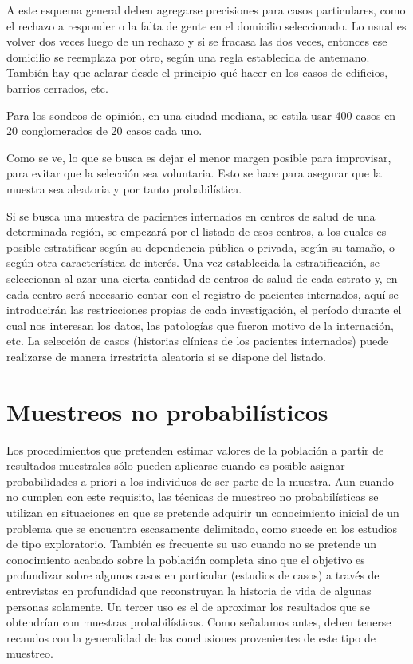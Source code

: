 \documentclass[]{book}
\begin{document}
A este esquema general deben agregarse precisiones para casos
particulares, como el rechazo a responder o la falta de gente en el
domicilio seleccionado. Lo usual es volver dos veces luego de un rechazo y si se fracasa las dos veces, entonces ese domicilio se reemplaza por otro, según una regla establecida de antemano. También hay que aclarar desde el principio qué hacer en los casos de edificios, barrios cerrados, etc.

Para los sondeos de opinión, en una ciudad mediana, se estila usar 400
casos en 20 conglomerados de 20 casos cada uno.

Como se ve, lo que se busca es dejar el menor margen posible para
improvisar, para evitar que la selección sea voluntaria. Esto se hace
para asegurar que la muestra sea aleatoria y por tanto probabilística.

Si se busca una muestra de pacientes internados en centros de salud de
una determinada región, se empezará por el listado de esos centros, a
los cuales es posible estratificar según su dependencia pública o
privada, según su tamaño, o según otra característica de interés. Una
vez establecida la estratificación, se seleccionan al azar una cierta
cantidad de centros de salud de cada estrato y, en cada centro será
necesario contar con el registro de pacientes internados, aquí se
introducirán las restricciones propias de cada investigación, el período
durante el cual nos interesan los datos, las patologías que fueron
motivo de la internación, etc. La selección de casos (historias clínicas
de los pacientes internados) puede realizarse de manera irrestricta
aleatoria si se dispone del listado.

\hypertarget{muestreos-no-probabilisticos}{%
\section{Muestreos no probabilísticos}\label{muestreos-no-probabilisticos}}

Los procedimientos que pretenden estimar valores de la población a
partir de resultados muestrales sólo pueden aplicarse cuando es posible
asignar probabilidades a priori a los individuos de ser parte de la
muestra. Aun cuando no cumplen con este requisito, las técnicas de
muestreo no probabilísticas se utilizan en situaciones en que se
pretende adquirir un conocimiento inicial de un problema que se
encuentra escasamente delimitado, como sucede en los estudios de tipo
exploratorio. También es frecuente su uso cuando no se pretende un
conocimiento acabado sobre la población completa sino que el objetivo es
profundizar sobre algunos casos en particular (estudios de casos) a
través de entrevistas en profundidad que reconstruyan la historia de
vida de algunas personas solamente. Un tercer uso es el de aproximar los
resultados que se obtendrían con muestras probabilísticas. Como
señalamos antes, deben tenerse recaudos con la generalidad de las
conclusiones provenientes de este tipo de muestreo.
\end{document}

